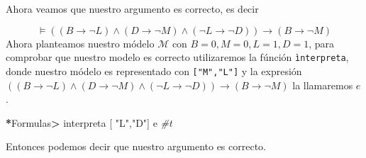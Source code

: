 \documentclass[
]{article}
\newenvironment{Shaded}{\begin{snugshade}}{\end{snugshade}}
\newcommand{\DataTypeTok}[1]{\textcolor[rgb]{0.13,0.29,0.53}{#1}}
\newcommand{\NormalTok}[1]{#1}
\newcommand{\OperatorTok}[1]{\textcolor[rgb]{0.81,0.36,0.00}{\textbf{#1}}}
\newcommand{\PreprocessorTok}[1]{\textcolor[rgb]{0.56,0.35,0.01}{\textit{#1}}}
\newcommand{\StringTok}[1]{\textcolor[rgb]{0.31,0.60,0.02}{#1}}
\begin{document}
Ahora veamos que nuestro argumento es correcto, es decir

\[
\models((B\rightarrow \neg L)\wedge (D\rightarrow\neg M)\wedge(\neg L\rightarrow\neg D))\rightarrow (B\rightarrow\neg M) 
\] Ahora planteamos nuestro módelo \(\mathcal{M}\) con
\(B=0, M=0, L=1, D=1\), para comprobar que nuestro modelo es correcto
utilizaremos la fúnción \texttt{ìnterpreta}, donde nuestro módelo es
representado con \texttt{{[}"M","L"{]}} y la expresión
\(((B\rightarrow \neg L)\wedge (D\rightarrow\neg M)\wedge(\neg L\rightarrow\neg D))\rightarrow (B\rightarrow\neg M)\)
la llamaremos \(e\).

\begin{Shaded}
\begin{Highlighting}[]
\OperatorTok{*}\DataTypeTok{Formulas}\OperatorTok{>}\NormalTok{ interpreta [ }\StringTok{"L"}\NormalTok{,}\StringTok{"D"}\NormalTok{] e}
\PreprocessorTok{#t}
\end{Highlighting}
\end{Shaded}

Entonces podemos decir que nuestro argumento es correcto.
\end{document}
